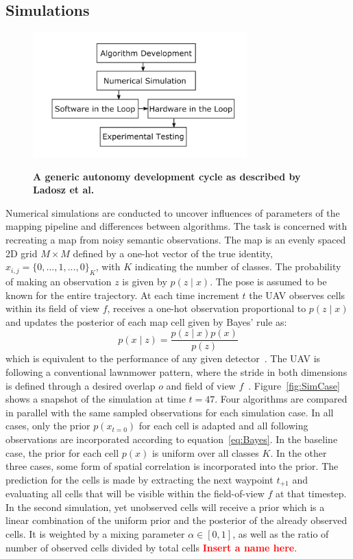 \documentclass[twocolumn,letterpaper]{IEEEAerospaceCLS}  %
\newcommand\todo[1]{\textbf{\textcolor{red}{#1}}}
\begin{document}
\subsection{Simulations} \label{ssec:MetSim}
\begin{figure}
    \centering
    \includegraphics[width=3.25in]{2-3DevelopmentCycle}\\
    \caption{\bf{A generic autonomy development cycle as described by Ladosz et al.~\protect\cite{ladosz_generic_2019}}}
    \label{fig:DevProcess}
\end{figure}
Numerical simulations are conducted to uncover influences of parameters of the mapping pipeline and differences between algorithms. The task is concerned with recreating a map from noisy semantic observations. The map is an evenly spaced 2D grid $M \times M$ defined by a one-hot vector of the true identity, $x_{i,j} = \{0,..., 1, ..., 0\}_K$, with $K$ indicating the number of classes. The probability of making an observation $z$ is given by $p(z\mid x)$. The pose is assumed to be known for the entire trajectory. At each time increment $t$ the UAV observes cells within its field of view $f$, receives a one-hot observation proportional to $p(z\mid x)$ and updates the posterior of each map cell given by Bayes' rule as:
\begin{equation} \label{eq:Bayes}
    p(x\mid z) = \frac{p(z\mid x) p(x)}{p(z)}
\end{equation}
which is equivalent to the performance of any given detector~\cite{alom_history_2018}.
The UAV is following a conventional lawnmower pattern, where the stride in both dimensions is defined through a desired overlap $o$ and field of view $f$~\cite{shetty_implementation_2020}. Figure~\ref{fig:SimCase} shows a snapshot of the simulation at time $t=47$.
Four algorithms are compared in parallel with the same sampled observations for each simulation case. In all cases, only the prior $p(x_{t=0})$ for each cell is adapted and all following observations are incorporated according to equation~\ref{eq:Bayes}. In the baseline case, the prior for each cell $p(x)$ is uniform over all classes $K$. In the other three cases, some form of spatial correlation is incorporated into the prior. The prediction for the cells is made by extracting the next waypoint $t_{+1}$ and evaluating all cells that will be visible within the field-of-view $f$ at that timestep. In the second simulation, yet unobserved cells will receive a prior which is a linear combination of the uniform prior and the posterior of the already observed cells. It is weighted by a mixing parameter $\alpha \in [0, 1]$, as well as the ratio of number of observed cells divided by total cells \todo{Insert a name here}.\\
\end{document}
